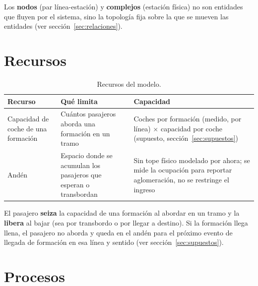 \documentclass{article}
\begin{document}
Los \textbf{nodos} (par línea-estación) y \textbf{complejos} (estación física) no son
entidades que fluyen por el sistema, sino la topología fija sobre la que se mueven
las entidades (ver sección~\ref{sec:relaciones}).

\section{Recursos}

\begin{table}[H]
\centering
\small
\begin{tabular}{@{}L{3.2cm}L{5cm}L{5.5cm}@{}}
\toprule
Recurso & Qué limita & Capacidad \\
\midrule
Capacidad de coche de una formación & Cuántos pasajeros aborda una formación en un
  tramo & Coches por formación (medido, por línea) $\times$ capacidad por coche
  (supuesto, sección~\ref{sec:supuestos}) \\
Andén & Espacio donde se acumulan los pasajeros que esperan o transbordan & Sin tope
  físico modelado por ahora; se mide la ocupación para reportar aglomeración, no se
  restringe el ingreso \\
\bottomrule
\end{tabular}
\caption{Recursos del modelo.}
\end{table}

El pasajero \textbf{seiza} la capacidad de una formación al abordar en un tramo y la
\textbf{libera} al bajar (sea por transbordo o por llegar a destino). Si la
formación llega llena, el pasajero no aborda y queda en el andén para el próximo
evento de llegada de formación en esa línea y sentido (ver
sección~\ref{sec:supuestos}).

\section{Procesos}
\end{document}
